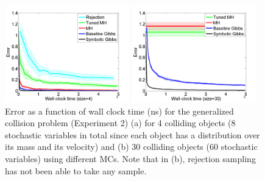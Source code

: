 \documentclass{article}
\begin{document}
\begin{figure}
\centering
\begin{minipage}[b]{0.33\textwidth}
     \includegraphics[width=1\linewidth, height=120pt]
{Figs/plots/collision/err-vs-time__param4-shaded.pdf}
     \caption{}
\label{fig:collision-err-vs-time4}
\end{minipage}
\begin{minipage}[b]{0.33\textwidth}
     \includegraphics[width=1\linewidth, height=120pt]
{Figs/plots/collision/err-vs-time__param30-shaded.pdf}
     \caption{}
\label{fig:collision-err-vs-time30}
\end{minipage}
\begin{minipage}[b]{0.33\textwidth}
      \caption{Error %
as a function of wall clock time (ns) for the generalized collision problem (Experiment 2) 
(a) for 4 colliding objects (8 stochastic variables in total since each object has a distribution over its mass and its velocity) and (b) 30 colliding objects (60 stochastic variables)
using different MCs. Note that in (b), rejection sampling has not been able to take any sample.}
      \label{fig:dummy}
    \end{minipage}
\end{figure}
\end{document}
